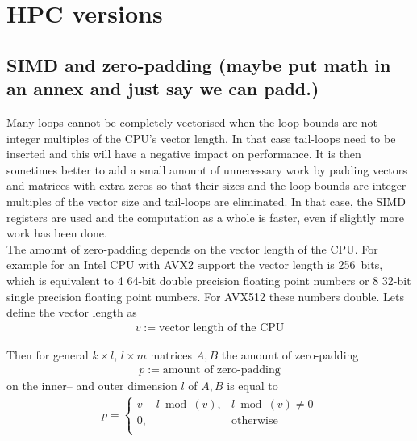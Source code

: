 \documentclass[11pt]{article}
\numberwithin{figure}{section}
\numberwithin{table}{section}
\begin{document}
  \section{HPC versions}
		
		    
		    
    \subsection{SIMD and zero-padding (maybe put math in an annex and just say we can padd.)}
				Many loops cannot be completely vectorised when the loop-bounds are not integer multiples of the CPU's vector length. In that case tail-loops need to be inserted and this will have a negative impact on performance. It is then sometimes better to add a small amount of unnecessary work by padding vectors and matrices with extra zeros so that their sizes and the loop-bounds are integer multiples of the vector size and tail-loops are eliminated. In that case, the SIMD registers are used and the computation as a whole is faster, even if slightly more work has been done.\\
				
				The amount of zero-padding depends on the vector length of the CPU. For example for an Intel CPU with AVX2 support the vector length is 256~bits, which is equivalent to 4 64-bit double precision floating point numbers or 8 32-bit single precision floating point numbers. For AVX512 these numbers double. Lets define the vector length as 
\begin{align}
	v := \text{vector length of the CPU}
\end{align}

Then for general $k\times l$, $l\times m $ matrices $A,B$ the amount of zero-padding 
\begin{align}
	p := \text{amount of zero-padding}
\end{align} 
on the inner-- and outer dimension $l$ of $A,B$ is equal to
\begin{align}
p= \left\{
\begin{array}{ll}
      v-l\bmod(v), & l\bmod(v)\neq0 \\
      0, & \text{otherwise}\\
\end{array} 
\right.	
\end{align}
\end{document}
